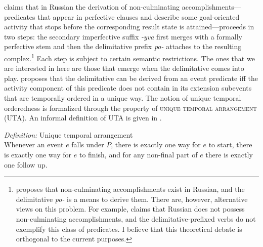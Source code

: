\documentclass[output=paper,
]{langscibook}
\begin{document}
\citet{tatevosov2017temporal} claims that in Russian the derivation of non-culminating accom\-plish\-ments—predicates that appear in perfective clauses and describe some goal-oriented activity that stops before the corresponding result state is attained—proceeds in two steps: the secondary imperfective suffix \textit{-yva} first merges with a formally perfective stem and then the delimitative prefix \textit{po-} attaches to the resulting complex.\footnote{\citet{tatevosov2017temporal} proposes that non-culminating accomplishments exist in Russian, and the delimitative \textit{po-} is a means to derive them. There are, however, alternative views on this problem. For example, \citet{martin2017non} claims that Russian does not possess non-culminating accomplishments, and the delimitative-prefixed verbs do not exemplify this class of predicates. I believe that this theoretical debate is orthogonal to the current purposes.} Each step is subject to certain semantic restrictions. The ones that we are interested in here are those that emerge when the delimitative comes into play. \citet{tatevosov2017temporal} proposes that the delimitative can be derived from an event predicate iff the activity component of this predicate does not contain in its extension subevents that are temporally ordered in a unique way. The notion of unique temporal orderedness is formalized through the property of \textsc{unique temporal arrangement} (UTA). An informal definition of UTA is given in .

\eanoraggedright \textit{Definition:} Unique temporal arrangement\smallskip\\
Whenever an event $e$ falls under $P$, there is exactly one way for $e$ to start, there is exactly one way for $e$ to finish, and for any non-final part of $e$ there is exactly one follow up.\label{ex:naumov:22}
\z
\end{document}
